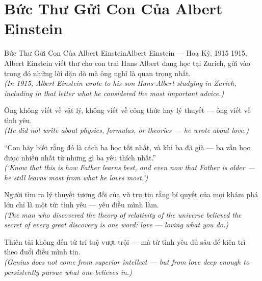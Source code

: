 \section{Bức Thư Gửi Con Của Albert Einstein}
\begin{truyen}{Bức Thư Gửi Con Của Albert Einstein}{Albert Einstein --- Hoa Kỳ, 1915}
 1915, Albert Einstein viết thư cho con trai Hans Albert đang học tại Zurich, gửi vào trong đó những lời dặn dò mà ông nghĩ là quan trọng nhất.\\[4pt]
\textit{(In 1915, Albert Einstein wrote to his son Hans Albert studying in Zurich, including in that letter what he considered the most important advice.)}

Ông không viết về vật lý, không viết về công thức hay lý thuyết --- ông viết về tình yêu.\\[4pt]
\textit{(He did not write about physics, formulas, or theories --- he wrote about love.)}

``Con hãy biết rằng đó là cách ba học tốt nhất, và khi ba đã già --- ba vẫn học được nhiều nhất từ những gì ba yêu thích nhất.''\\[4pt]
\textit{(`Know that this is how Father learns best, and even now that Father is older --- he still learns most from what he loves most.')}

Người tìm ra lý thuyết tương đối của vũ trụ tin rằng bí quyết của mọi khám phá lớn chỉ là một từ: tình yêu --- yêu điều mình làm.\\[4pt]
\textit{(The man who discovered the theory of relativity of the universe believed the secret of every great discovery is one word: love --- loving what you do.)}

\end{truyen}
\begin{baihoc}
  Thiên tài không đến từ trí tuệ vượt trội --- mà từ tình yêu đủ sâu để kiên trì theo đuổi điều mình tin.\\[4pt]
  \textit{(Genius does not come from superior intellect --- but from love deep enough to persistently pursue what one believes in.)}
\end{baihoc}

